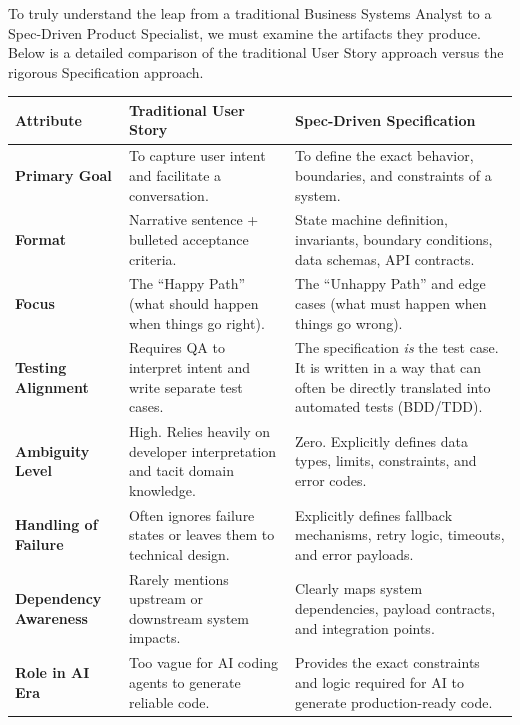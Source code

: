 \documentclass[
  11pt,
  openany,
  oneside]{book}
\begin{document}
To truly understand the leap from a traditional Business Systems Analyst
to a Spec-Driven Product Specialist, we must examine the artifacts they
produce. Below is a detailed comparison of the traditional User Story
approach versus the rigorous Specification approach.

\begin{longtable}[]{@{}
  >{\raggedright\arraybackslash}p{}
  >{\raggedright\arraybackslash}p{}
  >{\raggedright\arraybackslash}p{}@{}}
\toprule\noalign{}
\begin{minipage}[b]{\linewidth}\raggedright
Attribute
\end{minipage} & \begin{minipage}[b]{\linewidth}\raggedright
Traditional User Story
\end{minipage} & \begin{minipage}[b]{\linewidth}\raggedright
Spec-Driven Specification
\end{minipage} \\
\midrule\noalign{}
\endhead
\bottomrule\noalign{}
\endlastfoot
\textbf{Primary Goal} & To capture user intent and facilitate a
conversation. & To define the exact behavior, boundaries, and
constraints of a system. \\
\textbf{Format} & Narrative sentence + bulleted acceptance criteria. &
State machine definition, invariants, boundary conditions, data schemas,
API contracts. \\
\textbf{Focus} & The ``Happy Path'' (what should happen when things go
right). & The ``Unhappy Path'' and edge cases (what must happen when
things go wrong). \\
\textbf{Testing Alignment} & Requires QA to interpret intent and write
separate test cases. & The specification \emph{is} the test case. It is
written in a way that can often be directly translated into automated
tests (BDD/TDD). \\
\textbf{Ambiguity Level} & High. Relies heavily on developer
interpretation and tacit domain knowledge. & Zero. Explicitly defines
data types, limits, constraints, and error codes. \\
\textbf{Handling of Failure} & Often ignores failure states or leaves
them to technical design. & Explicitly defines fallback mechanisms,
retry logic, timeouts, and error payloads. \\
\textbf{Dependency Awareness} & Rarely mentions upstream or downstream
system impacts. & Clearly maps system dependencies, payload contracts,
and integration points. \\
\textbf{Role in AI Era} & Too vague for AI coding agents to generate
reliable code. & Provides the exact constraints and logic required for
AI to generate production-ready code. \\
\end{longtable}
\end{document}
